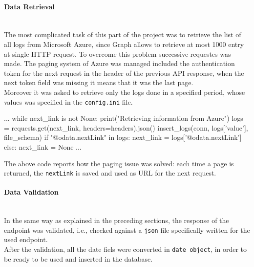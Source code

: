 \documentclass[12pt, a4paper, oneside]{article}
\begin{document}
\paragraph{Data Retrieval} ~\\
The most complicated task of this part of the project was to retrieve the list of all logs from Microsoft Azure, since Graph allows to retrieve at most 1000 entry at single HTTP request. To overcome this problem
successive requestes was made. The paging system of Azure was managed included the authentication token for the next request in the header of the previous API response, when the next token field was missing it means
that it was the last page.\\
Moreover it was asked to retrieve only the logs done in a specified period, whose values was specified in the \texttt{config.ini} file.
\begin{python}
    ...
    while next_link is not None:
        print("Retrieving information from Azure")
        logs = requests.get(next_link, headers=headers).json()
        insert_logs(conn, logs['value'], file_schema)
        if "@odata.nextLink" in logs:
            next_link = logs['@odata.nextLink']
        else:
            next_link = None
    ...
\end{python}
The above code reports how the paging issue was solved: each time a page is returned, the \texttt{nextLink} is saved and used as URL for the next request.

\paragraph{Data Validation} ~\\
In the same way as explained in the preceding sections, the response of the endpoint was validated, i.e., checked against a \texttt{json} file specifically written for the used endpoint.\\
After the validation, all the date fiels were converted in \texttt{date object}, in order to be ready to be used and inserted in the database.
\end{document}
